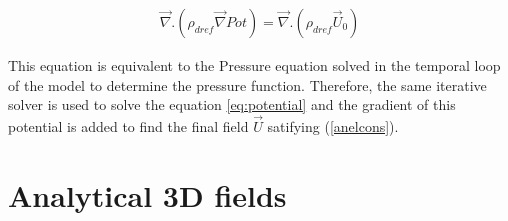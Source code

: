 \begin{eqnarray}
\vec { \nabla } .  \left( \rho _{dref} \vec {\nabla } Pot \right) = \vec { \nabla } .
 \left( \rho _{dref}  \vec{U} _0 \right) \label{eq:potential}
\end{eqnarray}

This equation is equivalent to the Pressure equation solved in the temporal loop
of the model to determine the pressure function. Therefore, the same iterative
solver is used to solve the equation \ref{eq:potential} and the gradient of this
potential is added to find the final field $\vec{U}$ satifying (\ref{anelcons}).


\section{Analytical 3D fields}

